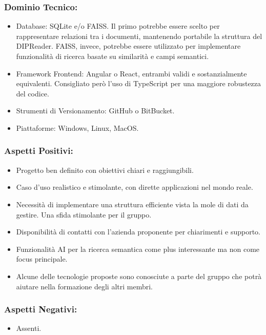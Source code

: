 \documentclass[a4paper,12pt]{article}
\begin{document}
\subsubsection*{Dominio Tecnico:}
\begin{itemize}
    \item Database: SQLite e/o FAISS. Il primo potrebbe essere scelto per rappresentare relazioni tra i documenti, mantenendo portabile la struttura del DIPReader. FAISS, invece, potrebbe essere utilizzato per implementare funzionalità di ricerca basate su similarità e campi semantici.
    \item Framework Frontend: Angular o React, entrambi validi e sostanzialmente equivalenti. Consigliato però l'uso di TypeScript per una maggiore robustezza del codice.
    \item Strumenti di Versionamento: GitHub o BitBucket.
    \item Piattaforme: Windows, Linux, MacOS.
\end{itemize}
\subsubsection*{Aspetti Positivi:}
\begin{itemize}
    \item Progetto ben definito con obiettivi chiari e raggiungibili.
    \item Caso d'uso realistico e stimolante, con dirette applicazioni nel mondo reale.
    \item Necessità di implementare una struttura efficiente vista la mole di dati da gestire. Una sfida stimolante per il gruppo.
    \item Disponibilità di contatti con l'azienda proponente per chiarimenti e supporto.
    \item Funzionalità AI per la ricerca semantica come plus interessante ma non come focus principale.
    \item Alcune delle tecnologie proposte sono conosciute a parte del gruppo che potrà aiutare nella formazione degli altri membri.
\end{itemize}

\subsubsection*{Aspetti Negativi:}
\begin{itemize}
    \item Assenti.
\end{itemize}
\end{document}
